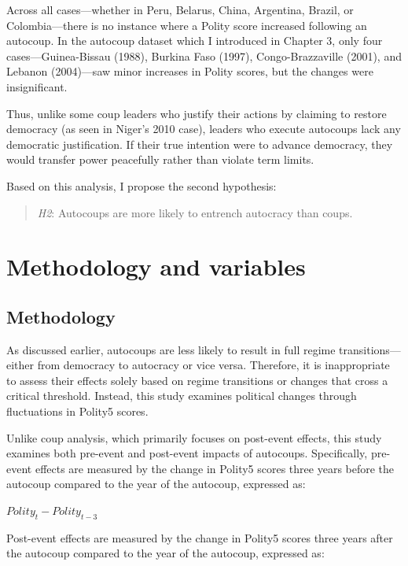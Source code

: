 \documentclass[
  12pt,
]{report}
\begin{document}
Across all cases---whether in Peru, Belarus, China, Argentina, Brazil,
or Colombia---there is no instance where a Polity score increased
following an autocoup. In the autocoup dataset which I introduced in
Chapter 3, only four cases---Guinea-Bissau (1988), Burkina Faso (1997),
Congo-Brazzaville (2001), and Lebanon (2004)---saw minor increases in
Polity scores, but the changes were insignificant.

Thus, unlike some coup leaders who justify their actions by claiming to
restore democracy (as seen in Niger's 2010 case), leaders who execute
autocoups lack any democratic justification. If their true intention
were to advance democracy, they would transfer power peacefully rather
than violate term limits.

Based on this analysis, I propose the second hypothesis:

\begin{quote}
\emph{H2}: Autocoups are more likely to entrench autocracy than coups.
\end{quote}

\section{Methodology and variables}\label{methodology-and-variables}

\subsection{Methodology}\label{methodology-1}

As discussed earlier, autocoups are less likely to result in full regime
transitions---either from democracy to autocracy or vice versa.
Therefore, it is inappropriate to assess their effects solely based on
regime transitions or changes that cross a critical threshold. Instead,
this study examines political changes through fluctuations in Polity5
scores.

Unlike coup analysis, which primarily focuses on post-event effects,
this study examines both pre-event and post-event impacts of autocoups.
Specifically, pre-event effects are measured by the change in Polity5
scores three years before the autocoup compared to the year of the
autocoup, expressed as:

\(Polity_t - Polity_{t-3}\)

Post-event effects are measured by the change in Polity5 scores three
years after the autocoup compared to the year of the autocoup, expressed
as:
\end{document}
